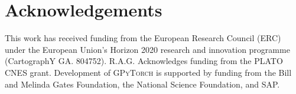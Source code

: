 \documentclass[fleqn,usenatbib]{mnras}
\begin{document}

%











\section*{Acknowledgements}
This work has received funding from the European Research Council (ERC) under the European Union’s Horizon 2020 research and innovation programme (CartographY GA. 804752). R.A.G. Acknowledges funding from the PLATO CNES grant.
Development of \textsc{GPyTorch} is supported by funding from the Bill and Melinda Gates Foundation, the National Science Foundation, and SAP.











%



\bsp	%
\label{lastpage}
\end{document}

